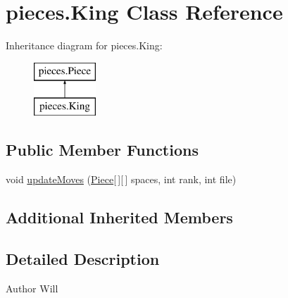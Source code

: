 \hypertarget{classpieces_1_1_king}{\section{pieces.\-King Class Reference}
\label{classpieces_1_1_king}
}
Inheritance diagram for pieces.\-King\-:\begin{figure}[H]
\begin{center}
\leavevmode
\includegraphics[height=2.000000cm]{classpieces_1_1_king}
\end{center}
\end{figure}
\subsection*{Public Member Functions}
\begin{DoxyCompactItemize}
\item 
void \hyperlink{classpieces_1_1_king_a7bfa15e882d90fbc6c5ec02f2d2dab20}{update\-Moves} (\hyperlink{classpieces_1_1_piece}{Piece}\mbox{[}$\,$\mbox{]}\mbox{[}$\,$\mbox{]} spaces, int rank, int file)
\end{DoxyCompactItemize}
\subsection*{Additional Inherited Members}


\subsection{Detailed Description}
\begin{DoxyAuthor}{Author}
Will 
\end{DoxyAuthor}


